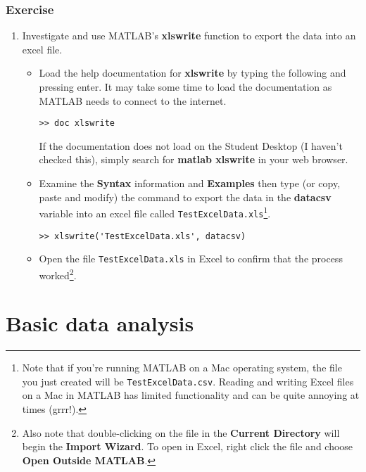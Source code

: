 \documentclass[12pt,a4paper]{article}
\begin{document}
\subsubsection*{Exercise}
\begin{enumerate}
	\item Investigate and use MATLAB's \textbf{xlswrite} function to export the data into an excel file.
	\begin{itemize}
		\item Load the help documentation for \textbf{xlswrite} by typing the following and pressing enter.  It may take some time to load the documentation as MATLAB needs to connect to the internet.
		\begin{lstlisting}[style=Matlab-editor]		
>> doc xlswrite
		\end{lstlisting}
		If the documentation does not load on the Student Desktop (I haven't checked this), simply search for \textbf{matlab xlswrite} in your web browser.
		\item Examine the \textbf{Syntax} information and \textbf{Examples} then type (or copy, paste and modify) the command to export the data in the \textbf{datacsv} variable into an excel file called \texttt{TestExcelData.xls}\footnote{Note that if you're running MATLAB on a Mac operating system, the file you just created will be \texttt{TestExcelData.csv}. Reading and writing Excel files on a Mac in MATLAB has limited functionality and can be quite annoying at times (grrr!).}.
		\begin{lstlisting}[style=Matlab-editor]
>> xlswrite('TestExcelData.xls', datacsv)
		\end{lstlisting}	
		\item Open the file \texttt{TestExcelData.xls} in Excel to confirm that the process worked\footnote{Also note that double-clicking on the file in the \textbf{Current Directory} will begin the \textbf{Import Wizard}.  To open in Excel, right click the file and choose \textbf{Open Outside MATLAB}.}.
	\end{itemize}
\end{enumerate}

\section{Basic data analysis}
\end{document}

